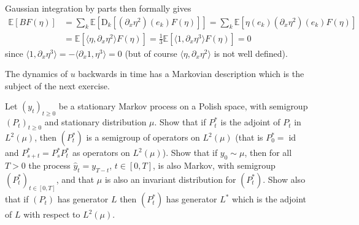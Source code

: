 \documentclass[a4paper,11pt]{article}
\newcommand{\mathD}{\mathrm{D}}
\newcommand{\tmop}[1]{\ensuremath{\operatorname{#1}}}
\begin{document}
Gaussian integration by parts then formally gives
\begin{equation*}
\begin{aligned}
\mathbb{E} [B F (\eta)] &= \sum_k \mathbb{E} [\mathD_k [(\partial_x
   \eta^2) (e_k) F (\eta)]] = \sum_k \mathbb{E} [\eta (e_k) (\partial_x
   \eta^2) (e_k) F (\eta)] \\
   & = \mathbb{E} [\langle \eta, \partial_x \eta^2 \rangle F (\eta)] = 
   \frac{1}{3} \mathbb{E} [\langle 1, \partial_x \eta^3 \rangle F (\eta)] = 0
\end{aligned}
\end{equation*}
since $ \langle 1, \partial_x \eta^3 \rangle = - \langle \partial_x 1, \eta^3
\rangle = 0$ (but of course $\langle \eta, \partial_x \eta^2 \rangle$ is not well defined).

\medskip
The dynamics of $u$ backwards in time has a Markovian description which is the
subject of the next exercise.

\begin{exercise}
  Let $(y_t)_{t \geqslant 0}$ be a stationary Markov process on a Polish
  space, with semigroup $(P_t)_{t \geqslant 0}$ and stationary distribution
  ${\mu}$. Show that if $P^{\ast}_t$ is the adjoint of $P_t$ in $L^2
  ({\mu})$, then $(P^{\ast}_t)$ is a semigroup of operators on $L^2
  ({\mu})$ (that is $P^{\ast}_0 = \tmop{id}$ and $P^{\ast}_{s + t} =
  P^{\ast}_s P^{\ast}_t$ as operators on $L^2 ({\mu})$). Show that if $y_0
  \sim {\mu}$, then for all $T > 0$ the process $\hat{y}_t = y_{T - t}$,
  $t \in [0, T]$, is also Markov, with semigroup $(P^{\ast}_t)_{t \in [0,
  T]}$, and that ${\mu}$ is also an invariant distribution for
  $(P^{\ast}_t)$. Show also that if $(P_t)$ has generator $L$ then
  $(P^{\ast}_t)$ has generator $L^{\ast}$ which is the adjoint of $L$ with
  respect to $L^2 ({\mu})$.
\end{exercise}
\end{document}
